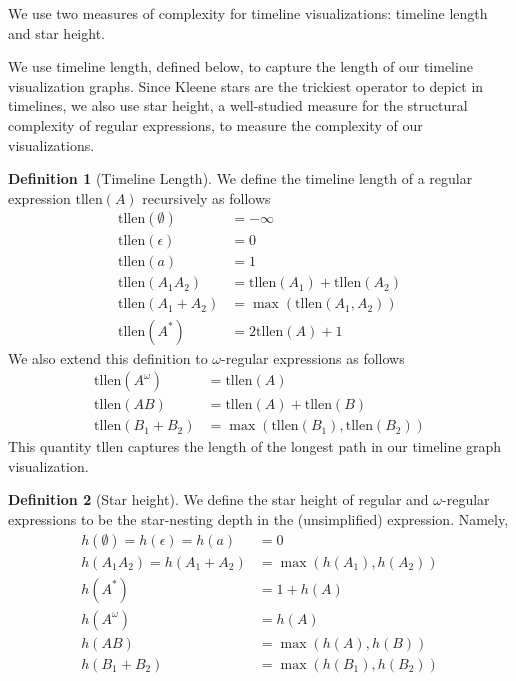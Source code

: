 \documentclass[preprint,12pt]{elsarticle}
\theoremstyle{definition}
\newtheorem{definition}{Definition}[section]
\theoremstyle{remark}
\newcommand{\tllen}{\text{tllen}}
\begin{document}

We use two measures of complexity for timeline visualizations: timeline length and star height.

We use timeline length, defined below, to capture the length of our timeline visualization graphs. Since Kleene stars are the trickiest operator to depict in timelines, we also use star height, a well-studied measure for the structural complexity of regular expressions, to measure the complexity of our visualizations.

\begin{definition}[Timeline Length]
    We define the timeline length of a regular expression $\tllen(A)$ recursively as follows
    \begin{align*}
        \tllen(\emptyset)   &= -\infty\\
        \tllen(\epsilon)        &= 0\\
        \tllen(a)           &= 1\\
        \tllen(A_1 A_2)     &= \tllen(A_1) + \tllen(A_2)\\
        \tllen(A_1 + A_2)   &= \max(\tllen(A_1, A_2))\\
        \tllen(A^*)         &= 2\tllen(A) + 1
    \end{align*}
    We also extend this definition to $\omega$-regular expressions as follows
    \begin{align*}
        \tllen(A^\omega)    &= \tllen(A)\\
        \tllen(AB)          &= \tllen(A) + \tllen(B)\\
        \tllen(B_1 + B_2)   &= \max(\tllen(B_1), \tllen(B_2))
    \end{align*}
    This quantity $\tllen$ captures the length of the longest path in our timeline graph visualization.
\end{definition}

\begin{definition}[Star height]
    We define the star height of regular and $\omega$-regular expressions to be the star-nesting depth in the (unsimplified) expression. Namely,
    \begin{align*}
        h(\emptyset) = h(\epsilon) = h(a) &= 0\\
        h(A_1 A_2) = h(A_1 + A_2) &= \max(h(A_1), h(A_2))\\
        h(A^*) &= 1 + h(A)\\
        h(A^\omega) &= h(A)\\
        h(A B) &= \max(h(A), h(B))\\
        h(B_1 + B_2) &= \max(h(B_1), h(B_2))
    \end{align*}

\end{definition}
\end{document}
